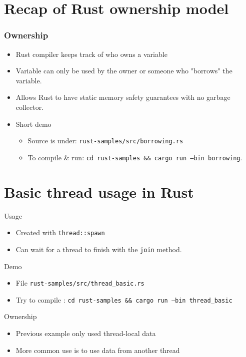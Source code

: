 \documentclass{beamer}
\begin{document}
\section{Recap of Rust ownership model}
\begin{frame}
    \frametitle{Ownership}
    \begin{itemize}
        \item Rust compiler keeps track of who owns a variable
        \item Variable can only be used by the owner or someone who "borrows" the variable.
        \item Allows Rust to have static memory safety guarantees with no garbage collector.
        \item Short demo
        \begin{itemize}
            \item Source is under: \texttt{rust-samples/src/borrowing.rs}
            \item To compile \& run: \texttt{cd rust-samples \&\& cargo run --bin borrowing}.
        \end{itemize}
    \end{itemize}
\end{frame}

\section{Basic thread usage in Rust}

\begin{frame}{Usage}
    \begin{itemize}
        \item Created with \texttt{thread::spawn}
        \item Can wait for a thread to finish with the \texttt{join} method.
    \end{itemize}
\end{frame}

\begin{frame}{Demo}
    \begin{itemize}
        \item File \texttt{rust-samples/src/thread\_basic.rs}
        \item Try to compile : \texttt{cd rust-samples \&\& cargo run --bin thread\_basic}
    \end{itemize}
\end{frame}

\begin{frame}{Ownership}
    \begin{itemize}
        \item Previous example only used thread-local data
        \item More common use is to use data from another thread
    \end{itemize}
\end{frame}
\end{document}
